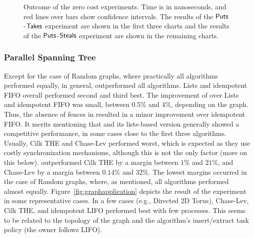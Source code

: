 \begin{figure}[!ht]
{  }

  \caption{\label{fig:zerocost} Outcome of the zero cost experiments. Time is in nanoseconds, and red lines over bars show confidence intervals. The results of the ${\sf Puts}$-${\sf Takes}$ experiment are shown in the first three charts and the results of the ${\sf Puts}$-${\sf Steals}$ experiment are shown in the remaining charts.}

\end{figure}


\subsubsection{Parallel Spanning Tree}


Except for the case of Random graphs, where practically all algorithms performed equally, in general, \NCWSM{} outperformed all algorithms.  \NCWSM Lists and idempotent FIFO overall performed second and third best. The improvement of \NCWSM{} over \NCWSM Lists and idempotent FIFO was small, between 0.5\% and 4\%, depending on the graph. Thus, the absence of fences in \NCWSM{} resulted in a minor improvement over idempotent FIFO. It merits mentioning that \BNCWSM and its lists-based version generally showed a competitive performance, in some cases close to the first three algorithms. Usually, Cilk THE and Chase-Lev performed worst, which is expected as they use costly synchronization mechanisms, although this is not the only factor (more on this below).  \NCWSM outperformed Cilk THE by a margin between $1\%$ and $21\%$, and Chase-Lev by a margin between $0.14\%$ and $32\%$.  The lowest margins occurred in the case of Random graphs, where, as mentioned, all algorithms performed almost equally. Figure~\ref{fig:graphapplication} depicts the result of the experiment in some representative cases. In a few cases (e.g., Directed 2D Torus), Chase-Lev, Cilk THE, and idempotent LIFO performed best with few processes. This seems to be related to the topology of the graph and the algorithm's insert/extract task policy (the owner follows LIFO).

